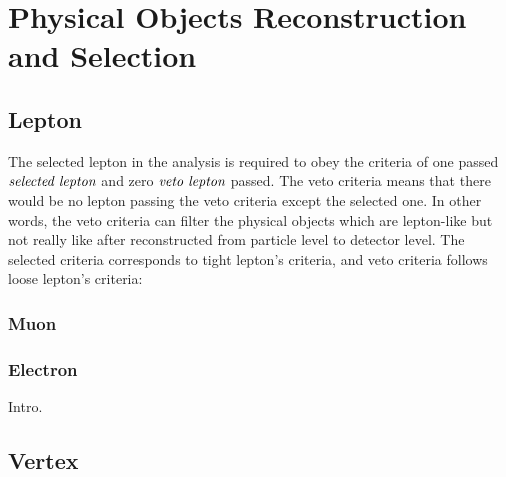 

\section{Physical Objects Reconstruction and Selection}
\label{sec:PhysObj}

\subsection{Lepton}
	\label{ssec:PhysObj_lep}

		The selected lepton in the analysis is required to obey the criteria of one passed $\emph{selected lepton}$ and zero $\emph{veto lepton}$ passed. The veto criteria means that there would be no lepton passing the veto criteria except the selected one. In other words, the veto criteria can filter the physical objects which are lepton-like but not really like after reconstructed from particle level to detector level. The selected criteria corresponds to tight lepton's criteria, and veto criteria follows loose lepton's criteria:

		\subsubsection{Muon}
		\label{sssec:Muon}
		

		\subsubsection{Electron}
		\label{sssec:Electron}


Intro.

\subsection{Vertex}
\label{ssec:PhysObj_vertex}


\FloatBarrier
